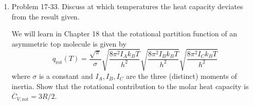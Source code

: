 \documentclass[../psets.tex]{subfiles}
\begin{document}
\begin{enumerate}
    \item Problem 17-33. Discuss at which temperatures the heat capacity deviates from the result given.\par
    We will learn in Chapter 18 that the rotational partition function of an asymmetric top molecule is given by
    \begin{equation*}
        q_\text{rot}(T) = \frac{\sqrt{\pi}}{\sigma}\sqrt{\frac{8\pi^2I_Ak_BT}{h^2}}\sqrt{\frac{8\pi^2I_Bk_BT}{h^2}}\sqrt{\frac{8\pi^2I_Ck_BT}{h^2}}
    \end{equation*}
    where $\sigma$ is a constant and $I_A,I_B,I_C$ are the three (distinct) moments of inertia. Show that the rotational contribution to the molar heat capacity is $\overline{C}_{V,\text{rot}}=3R/2$.
\end{enumerate}
\end{document}
